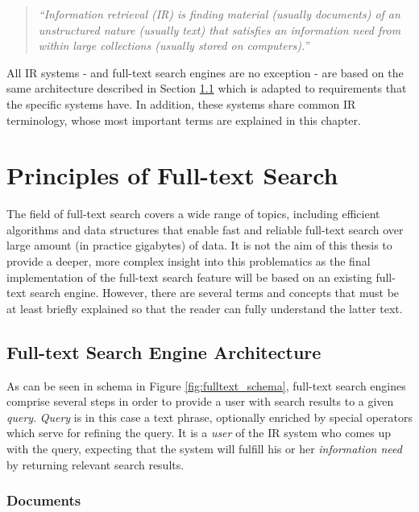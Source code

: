 	\begin{quote}
		\textsl{``Information retrieval (IR) is finding material (usually documents) of an unstructured nature (usually  text) that satisfies an information need from within large collections (usually stored on computers).''}
	\end{quote}

All IR systems - and full-text search engines are no exception - are based on the same architecture described in Section \ref{fullTextArch} which is adapted to requirements that the specific systems have. In addition, these systems share common IR terminology, whose most important terms are explained in this chapter.

\section{Principles of Full-text Search}


The field of full-text search covers a wide range of topics, including efficient algorithms and data structures that enable fast and reliable full-text search over large amount (in practice gigabytes) of data. 
It is not the aim of this thesis to provide a deeper, more complex insight into this problematics as the final implementation of the full-text search feature will be based on an existing full-text search engine. 
However, there are several terms and concepts that must be at least briefly explained so that the reader can fully understand the latter text.


\subsection{Full-text Search Engine Architecture}
\label{fullTextArch}

As can be seen in schema in Figure \ref{fig:fulltext_schema}, full-text search engines comprise several steps in order to provide a user with search results to a given \textsl{query}. 
\textsl{Query} is in this case a text phrase, optionally enriched by special operators which serve for refining the query. 
It is a \textsl{user} of the IR system who comes up with the query, expecting that the system will fulfill his or her \textsl{information need} by returning relevant search results.

\subsubsection{Documents}

